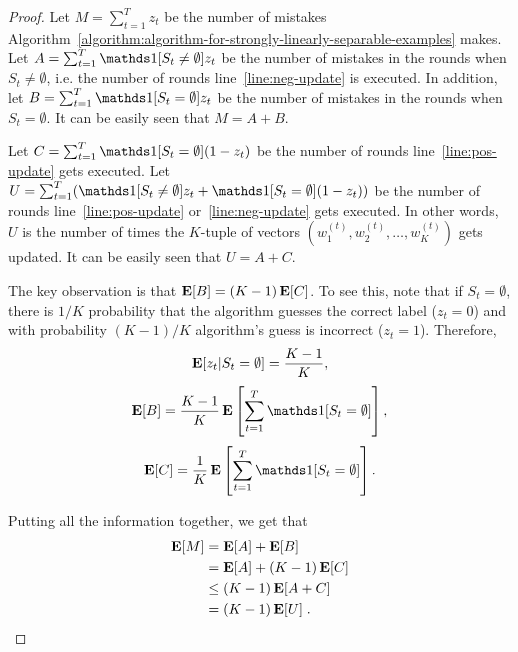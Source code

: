 \begin{proof}
Let $M = \sum_{t=1}^T z_t$ be the number of
mistakes Algorithm~\ref{algorithm:algorithm-for-strongly-linearly-separable-examples} makes.
Let $A = \sum_{t=1}^T \one[S_t \neq \emptyset] z_t$ be the number of mistakes in the rounds
when $S_t \neq \emptyset$, i.e. the number of rounds line~\ref{line:neg-update} is
executed.
In addition, let $B = \sum_{t=1}^T \one[S_t = \emptyset] z_t$ be the
number of mistakes in the rounds when $S_t = \emptyset$.
It can be easily seen that $M = A + B$.

Let $C = \sum_{t=1}^T \one[S_t = \emptyset](1 - z_t)$ be the number of rounds
line~\ref{line:pos-update} gets executed. Let
$U = \sum_{t=1}^T (\one[S_t \neq \emptyset] z_t + \one[S_t = \emptyset](1 - z_t))$
be the number of rounds line~\ref{line:pos-update} or~\ref{line:neg-update}
gets executed. In other words, $U$ is the number of times the $K$-tuple of
vectors $(w_1^{(t)}, w_2^{(t)}, \dots, w_K^{(t)})$ gets updated. It can be
easily seen that $U = A + C$.

The key observation is that $\operatorname*{\mathbf{E}}[B] = (K-1) \operatorname*{\mathbf{E}}[C]$.
To see this, note that if $S_t = \emptyset$, there is $1/K$ probability that the algorithm
guesses the correct label ($z_t = 0$) and with probability $(K-1)/K$ algorithm's guess is
incorrect ($z_t = 1$). Therefore,
\[ \operatorname*{\mathbf{E}}[ z_t |S_t = \emptyset] = \frac{K-1}{K}, \]
\[ \Exp[B] = \frac{K-1}{K} \Exp \sbr{ \sum_{t=1}^T \one[S_t = \emptyset] }, \]
\[ \Exp[C] = \frac{1}{K} \Exp \sbr{ \sum_{t=1}^T \one[S_t = \emptyset] }. \]

Putting all the information together, we get that
\begin{align}
\operatorname*{\mathbf{E}}[M]
& = \operatorname*{\mathbf{E}}[A] + \operatorname*{\mathbf{E}}[B] \nonumber \\
& = \operatorname*{\mathbf{E}}[A] + (K-1) \operatorname*{\mathbf{E}}[C] \nonumber \\
& \le (K-1) \operatorname*{\mathbf{E}}[A + C] \nonumber\\
& = (K-1) \operatorname*{\mathbf{E}}[U]  \; .
\label{eqn:mistake-update}
\end{align}


\end{proof}
